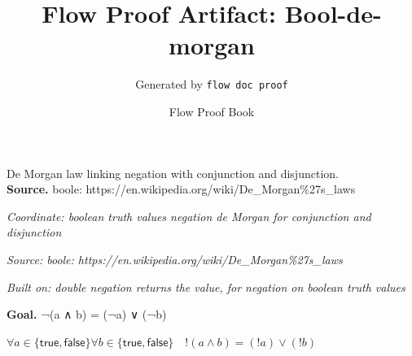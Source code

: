 \documentclass[11pt]{article}
\title{Flow Proof Artifact: Bool-de-morgan}
\author{Generated by \texttt{flow doc proof}}
\date{Flow Proof Book}
\theoremstyle{definition}
\begin{document}
\maketitle
De Morgan law linking negation with conjunction and disjunction.\\[0.5em]
\textbf{Source.} boole: https://en.wikipedia.org/wiki/De\_Morgan\%27s\_laws\\[0.5em]
\bigskip
{}\par
\smallskip\noindent\textit{Coordinate: boolean truth values \cdot negation \cdot de Morgan for conjunction and disjunction}\par
\smallskip\noindent\textit{Source: boole: https://en.wikipedia.org/wiki/De\_Morgan\%27s\_laws}\par
\smallskip\noindent\textit{Built on: double negation returns the value, for negation on boolean truth values}\par
\medskip
\noindent\textbf{Goal.} ¬(a ∧ b) = (¬a) ∨ (¬b)\par
\noindent$\displaystyle \forall a \in \{\mathsf{true}, \mathsf{false}\} \forall b \in \{\mathsf{true}, \mathsf{false}\}\quad !(a \land b) = (!a) \lor (!b)$\par
\medskip
\noindent
\end{document}
